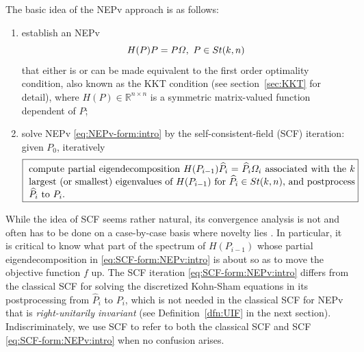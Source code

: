 \documentclass[11pt]{article}
\def\bbR{\mathbb{R}}
\def\what{\widehat}
\newcommand\STM[2]{{\rm St}(#1,#2)}
\theoremstyle{definition}
\numberwithin{equation}{section}
\begin{document}
The basic idea of the NEPv approach \cite{zhys:2020,zhwb:2022,wazl:2023} is as follows:
\begin{enumerate}[(1)]
  \item establish  an NEPv
      \begin{equation}\label{eq:NEPv-form:intro}
      H(P)P=P\Omega, \,\, P\in\STM{k}{n}
      \end{equation}
      that either is or can be made equivalent to the first order optimality condition,
      also known as the KKT condition
      (see section~\ref{sec:KKT} for detail),
      where $H(P)\in\bbR^{n\times n}$ is a symmetric matrix-valued function dependent of $P$;
  \item solve NEPv \eqref{eq:NEPv-form:intro} by the self-consistent-field (SCF) iteration: given $P_0$, iteratively
      \begin{equation}\label{eq:SCF-form:NEPv:intro}
      \framebox{
      \parbox{12.0cm}{
      compute partial eigendecomposition $H(P_{i-1})\what P_i=\what P_i\Omega_i$
      associated with the $k$ largest (or smallest) eigenvalues of $H(P_{i-1})$
                  for $\what P_i\in\STM{k}{n}$,  and postprocess $\what P_i$ to $P_i$.
      }}
      \end{equation}
\end{enumerate}
While the idea of SCF seems rather natural, its convergence analysis is not and often has to be done on a case-by-case basis where
novelty lies \cite{cazb:2018,ball:2022,luli:2024,zhwb:2022,wazl:2023}. In particular, it is critical to know
what part of the spectrum of $H(P_{i-1})$ whose partial eigendecomposition in \eqref{eq:SCF-form:NEPv:intro} is about so as to move the objective function
$f$ up.
The SCF iteration \eqref{eq:SCF-form:NEPv:intro} differs from
the classical SCF  for solving the discretized
Kohn-Sham equations in its postprocessing from $\what P_i$ to $P_i$, which is not needed in the classical SCF for NEPv
that is {\em right-unitarily invariant\/} (see Definition~\ref{dfn:UIF} in the next section).
Indiscriminately, we use SCF to
refer to both the classical SCF and SCF \eqref{eq:SCF-form:NEPv:intro} when no confusion arises.
\end{document}
